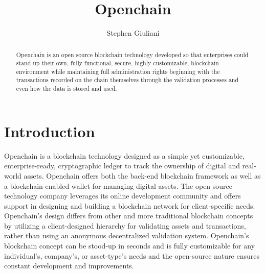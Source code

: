 
\title{Openchain}


\author{Stephen Giuliani}

\renewcommand{\shortauthors}{S. Giuliani}

\begin{abstract}
Openchain is an open source blockchain technology developed so that enterprises could stand up their own, fully functional, secure, highly customizable, blockchain environment while maintaining full administration rights beginning with the transactions recorded on the chain themselves through the validation processes and even how the data is stored and used.
\end{abstract}


\maketitle

\section{Introduction}
Openchain is a blockchain technology designed as a simple yet customizable, enterprise-ready, cryptographic ledger to track the ownership of digital and real-world assets. Openchain offers both the back-end blockchain framework as well as a blockchain-enabled wallet for managing digital assets. The open source technology company leverages its online development community and offers support in designing and building a blockchain network for client-specific needs. Openchain's design differs from other and more traditional blockchain concepts by utilizing a client-designed hierarchy for validating assets and transactions, rather than using an anonymous decentralized validation system. Openchain's blockchain concept can be stood-up in seconds and is fully customizable for any individual's, company's, or asset-type's needs and the open-source nature ensures constant development and improvements.

